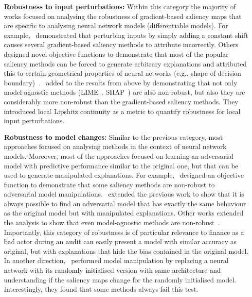 \documentclass[sigconf]{acmart}
\begin{document}
\textbf{Robustness to input perturbations:} Within this category the majority of works focused on analysing the robustness of gradient-based saliency maps that are specific to analysing neural network models (differentiable models). For example,~\citet{Kindermans_arXiv_2017} demonstrated that perturbing inputs by simply adding a constant shift causes several gradient-based saliency methods to attribute incorrectly. Others designed novel objective functions to demonstrate that most of the popular saliency methods can be forced to generate arbitrary explanations and attributed this to certain geometrical properties of neural networks (e.g., shape of decision boundary)~\cite{Ghorbani_aaai_2019, Dombrowski_neurips_2019}.~ \citet{Melis_arXiv_2018} added to the results from above by demonstrating that not only model-agnostic methods (LIME~\cite{Ribeiro_kdd_2016}, SHAP~\cite{Lundberg_neurips_2017}) are also non-robust, but also they are considerably more non-robust than the gradient-based saliency methods. They introduced local Lipshitz continuity as a metric to quantify robustness for local input perturbations.

\textbf{Robustness to model changes:} Similar to the previous category, most approaches focused on analysing methods in the context of neural network models. Moreover, most of the approaches focused on learning an adversarial model with predictive performance similar to the  original one, but that can be used to generate manipulated explanations. For example,~\citet{Heo_neurips_2019} designed an objective function to demonstrate that some saliency methods are non-robust to adversarial model manipulations.~\citet{Anders_arXiv_2020} extended the previous work to show that it is always possible to find an adversarial model that has exactly the same behaviour as the original model but with manipulated explanations. Other works extended the analysis to show that even model-agnostic methods are non-robust~\cite{Dimanov_aaai_ws_2020, Slack_aies_2020}. Importantly, this category of robustness is of particular relevance to finance as a bad actor during an audit can easily present a model with similar accuracy as original, but with explanations that hide the bias contained in the original model. In another direction,~\citet{Adebayo_neurips_2018} performed model manipulation by replacing a neural network with its randomly initialised version with same architecture and understanding if the saliency maps change for the randomly initialised model. Interestingly, they found that some methods always fail this test.
\end{document}
